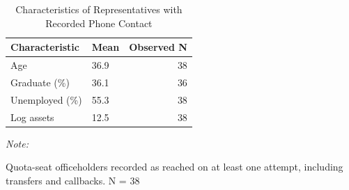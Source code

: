 \begin{table}[!h]
\centering
\caption{\label{tab:phone_reply_char}Characteristics of Representatives with Recorded Phone Contact}
\centering
\fontsize{8}{10}\selectfont
\begin{threeparttable}
\begin{tabular}[t]{llr}
\toprule
Characteristic & Mean & Observed N\\
\midrule
Age & 36.9 & 38\\
Graduate (\%) & 36.1 & 36\\
Unemployed (\%) & 55.3 & 38\\
Log assets & 12.5 & 38\\
\bottomrule
\end{tabular}
\begin{tablenotes}
\item \textit{Note: } 
\item Quota-seat officeholders recorded as reached on at least one attempt, including transfers and callbacks. N = 38
\end{tablenotes}
\end{threeparttable}
\end{table}
